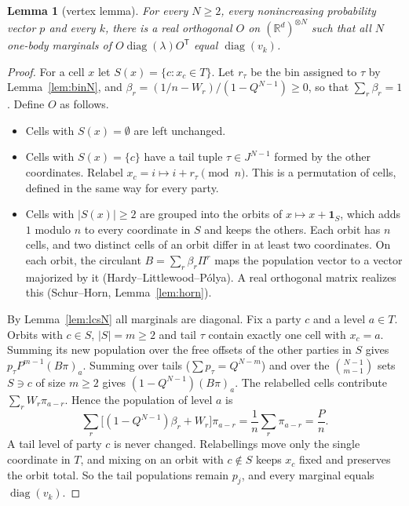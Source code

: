 \documentclass[11pt]{amsart}
\newtheorem{lemma}{Lemma}[section]
\theoremstyle{definition}
\theoremstyle{remark}
\numberwithin{equation}{section}
\newcommand{\R}{\mathbb{R}}
\newcommand{\diag}{\operatorname{diag}}
\begin{document}
\begin{lemma}[vertex lemma]\label{lem:vertexN}
For every $N\ge2$, every nonincreasing probability vector $p$ and every $k$, there is a real orthogonal $O$ on
$(\R^d)^{\otimes N}$ such that all $N$ one-body marginals of $O\diag(\lambda)O^{\mathsf T}$ equal $\diag(v_k)$.
\end{lemma}
\begin{proof}
For a cell $x$ let $S(x)=\{c:x_c\in T\}$. Let $r_\tau$ be the bin assigned to $\tau$ by Lemma~\ref{lem:binN}, and
$\beta_r=(1/n-W_r)/(1-Q^{N-1})\ge0$, so that $\sum_r\beta_r=1$. Define $O$ as follows.
\begin{itemize}
\item Cells with $S(x)=\emptyset$ are left unchanged.
\item Cells with $S(x)=\{c\}$ have a tail tuple $\tau\in J^{N-1}$ formed by the other coordinates. Relabel
$x_c=i\mapsto i+r_\tau\pmod n$. This is a permutation of cells, defined in the same way for every party.
\item Cells with $|S(x)|\ge2$ are grouped into the orbits of $x\mapsto x+\mathbf 1_S$, which adds $1$ modulo $n$ to every
coordinate in $S$ and keeps the others. Each orbit has $n$ cells, and two distinct cells of an orbit differ in at least
two coordinates. On each orbit, the circulant $B=\sum_r\beta_r\Pi^r$ maps the population vector to a vector majorized
by it (Hardy--Littlewood--P\'olya). A real orthogonal matrix realizes this (Schur--Horn, Lemma~\ref{lem:horn}).
\end{itemize}
By Lemma~\ref{lem:lcsN} all marginals are diagonal. Fix a party $c$ and a level $a\in T$. Orbits with $c\in S$,
$|S|=m\ge2$ and tail $\tau$ contain exactly one cell with $x_c=a$. Summing its new population over the free offsets of
the other parties in $S$ gives $p_\tau P^{m-1}(B\pi)_a$. Summing over tails ($\sum p_\tau=Q^{N-m}$) and over the
$\binom{N-1}{m-1}$ sets $S\ni c$ of size $m\ge2$ gives $(1-Q^{N-1})(B\pi)_a$. The relabelled cells contribute
$\sum_rW_r\pi_{a-r}$. Hence the population of level $a$ is
\[
  \sum_r\bigl[(1-Q^{N-1})\beta_r+W_r\bigr]\pi_{a-r}=\frac1n\sum_r\pi_{a-r}=\frac Pn .
\]
A tail level of party $c$ is never changed. Relabellings move only the single coordinate in $T$, and mixing on an
orbit with $c\notin S$ keeps $x_c$ fixed and preserves the orbit total. So the tail populations remain $p_j$, and
every marginal equals $\diag(v_k)$.
\end{proof}
\end{document}
